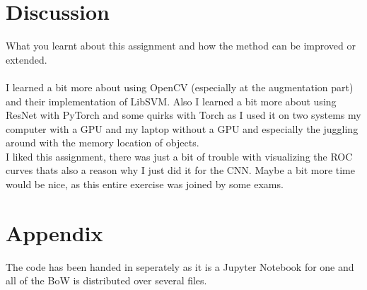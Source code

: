 \documentclass[UTF-8]{article}
\begin{document}
\newpage
\section{Discussion}
What  you  learnt  about  this  assignment  and  how  the  method  can  be  improved  or 
extended.\\\\
I learned a bit more about using OpenCV (especially at the augmentation part) and their implementation of LibSVM. Also I learned a bit more about using ResNet with PyTorch and some quirks with Torch as I used it on two systems my computer with a GPU and my laptop without a GPU and especially the juggling around with the memory location of objects.\\
I liked this assignment, there was just a bit of trouble with visualizing the ROC curves thats also a reason why I just did it for the CNN. Maybe a bit more time would be nice, as this entire exercise was joined by some exams.

\newpage
\section{Appendix}
The code has been handed in seperately as it is a Jupyter Notebook for one and all of the BoW is distributed over several files.
\end{document}
